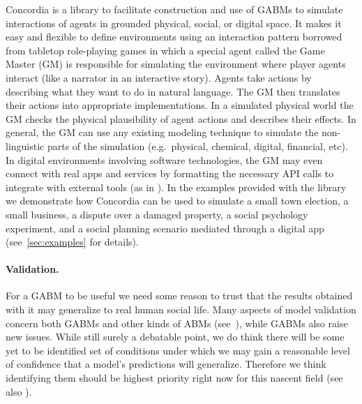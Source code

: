 \documentclass[11pt, a4paper, logo, twocolumn, internal, copyright, numbering]{googledeepmind}
\begin{document}
Concordia is a library to facilitate construction and use of GABMs to simulate interactions of agents in grounded physical, social, or digital space. It makes it easy and flexible to define environments using an interaction pattern borrowed from tabletop role-playing games in which a special agent called the Game Master (GM) is responsible for simulating the environment where player agents interact (like a narrator in an interactive story). Agents take actions by describing what they want to do in natural language. The GM then translates their actions into appropriate implementations. In a simulated physical world the GM checks the physical plausibility of agent actions and describes their effects. In general, the GM can use any existing modeling technique to simulate the non-linguistic parts of the simulation (e.g.~physical, chemical, digital, financial, etc). In digital environments involving software technologies, the GM may even connect with real apps and services by formatting the necessary API calls to integrate with external tools (as in \cite{schick2023toolformer}). In the examples provided with the library we demonstrate how Concordia can be used to simulate a small town election, a small business, a dispute over a damaged property, a social psychology experiment, and a social planning scenario mediated through a digital app (see~\ref{sec:examples} for details).

\paragraph{Validation.} For a GABM to be useful we need some reason to trust that the results obtained with it may generalize to real human social life. Many aspects of model validation concern both GABMs and other kinds of ABMs (see~\cite{windrum2007empirical}), while GABMs also raise new issues. While still surely a debatable point, we do think there will  be some yet to be identified set of conditions under which we may gain a reasonable level of confidence that a model's predictions will generalize. Therefore we think  identifying them should be highest priority right now for this nascent field (see also \cite{dillion2023can, grossmann2023ai}).
\end{document}
